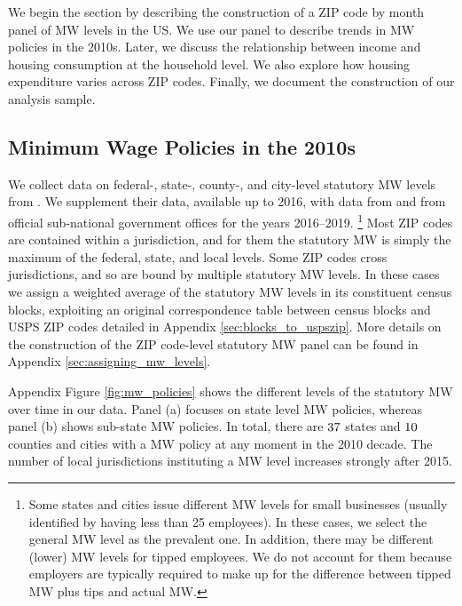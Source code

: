 
We begin the section by describing the construction of a ZIP code by month panel
of MW levels in the US. 
We use our panel to describe trends in MW policies in the 2010s.
Later, we discuss the relationship between income and housing consumption at the
household level.
We also explore how housing expenditure varies across ZIP codes.
Finally, we document the construction of our analysis sample.

\subsection{Minimum Wage Policies in the 2010s}

We collect data on federal-, state-, county-, and city-level statutory MW levels 
from \textcite{VaghulZipperer2016}.
We supplement their data, available up to 2016, with data from 
\textcite{BerkeleyLaborCenter} and from official sub-national government offices 
for the years 2016--2019.%
\footnote{Some states and cities issue different MW levels for small businesses
(usually identified by having less than 25 employees).
In these cases, we select the general MW level as the prevalent one.
In addition, there may be different (lower) MW levels for tipped employees.
We do not account for them because employers are typically required to make up 
for the difference between tipped MW plus tips and actual MW.}
%
%
Most ZIP codes are contained within a jurisdiction, and for them the statutory 
MW is simply the maximum of the federal, state, and local levels.
Some ZIP codes cross jurisdictions, and so are bound by multiple statutory MW 
levels.
In these cases we assign a weighted average of the statutory MW levels in its
constituent census blocks, exploiting an original correspondence table between 
census blocks and USPS ZIP codes detailed in 
Appendix \ref{sec:blocks_to_uspszip}.
More details on the construction of the ZIP code-level statutory MW panel 
can be found in Appendix \ref{sec:assigning_mw_levels}.

Appendix Figure \ref{fig:mw_policies} shows the different levels of the 
statutory MW over time in our data.
Panel (a) focuses on state level MW policies, whereas
panel (b) shows sub-state MW policies.
In total, there are $\textnormal{37}$ states and $\textnormal{10}$ counties and 
cities with a MW policy at any moment in the 2010 decade.
The number of local jurisdictions instituting a MW level increases strongly
after 2015.

